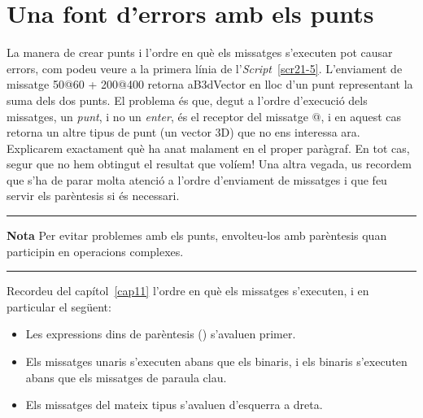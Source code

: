\section{Una font d'errors amb els punts}
La manera de crear punts i l'ordre en què els missatges s'executen pot causar errors, com podeu veure a la primera línia de l'\emph{Script}~\ref{scr21-5}. L'enviament de missatge \textsf{50@60 + 200@400} retorna \textsf{aB3dVector} en lloc d'un punt representant la suma dels dos punts. El problema és que, degut a l'ordre d'execució dels missatges, un \emph{punt}, i no un \emph{enter}, és el receptor del missatge \textsf{@}, i en aquest cas retorna un altre tipus de punt (un vector 3D) que no ens interessa ara. Explicarem exactament què ha anat malament en el proper paràgraf. En tot cas, segur que no hem obtingut el resultat que volíem! Una altra vegada, us recordem que s'ha de parar molta atenció a l'ordre d'enviament de missatges i que feu servir els parèntesis si és necessari.

\noindent
\rule{\textwidth}{2pt}
\noindent
\textbf{Nota} Per evitar problemes amb els punts, envolteu-los amb parèntesis quan participin en operacions complexes.\\
\noindent
\rule{\textwidth}{2pt}
\vspace*{2mm}

Recordeu del capítol~\ref{cap11} l'ordre en què els missatges s'executen, i en particular el següent:
\begin{itemize}
\item Les expressions dins de parèntesis () s'avaluen primer.
\item Els missatges unaris s'executen abans que els binaris, i els binaris s'executen abans que els missatges de paraula clau.
\item Els missatges del mateix tipus s'avaluen d'esquerra a dreta.
\end{itemize}

